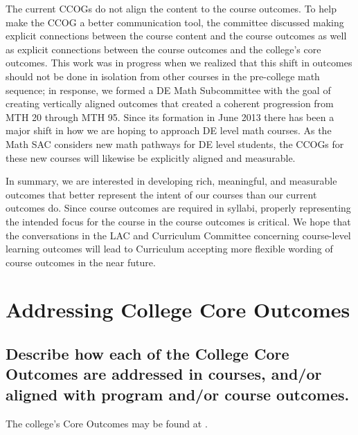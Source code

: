 The current CCOGs do not align the content to the course outcomes. To help
make the CCOG a better communication tool, the committee discussed making
explicit connections between the course content and the course outcomes as well
as explicit connections between the course outcomes and the college's core
outcomes.  This work was in progress when we realized that this shift in
outcomes should not be done in isolation from other courses in the pre-college
math sequence; in response, we formed a DE Math Subcommittee with the goal of
creating vertically aligned outcomes that created a coherent progression from
MTH 20 through MTH 95.  Since its formation in June 2013 there has been a major
shift in how we are hoping to approach DE level math courses.  As the Math SAC
considers new math pathways for DE level students, the CCOGs for these new
courses will likewise be explicitly aligned and measurable.

In summary, we are interested in developing rich, meaningful, and measurable
outcomes that better represent the intent of our courses than our current
outcomes do. Since course outcomes are required in syllabi, properly
representing the intended focus for the course in the course outcomes is
critical. We hope that the conversations in the LAC and Curriculum Committee
concerning course-level learning outcomes will lead to Curriculum accepting more
flexible wording of course outcomes in the near future.


\section{Addressing College Core Outcomes}

\subsection[Outcomes in courses and the math program]{Describe how each of the
	College Core Outcomes are addressed in courses, and/or aligned with program
and/or course outcomes.}

The college's Core Outcomes may be found at \cite{coreoutcomes}.

